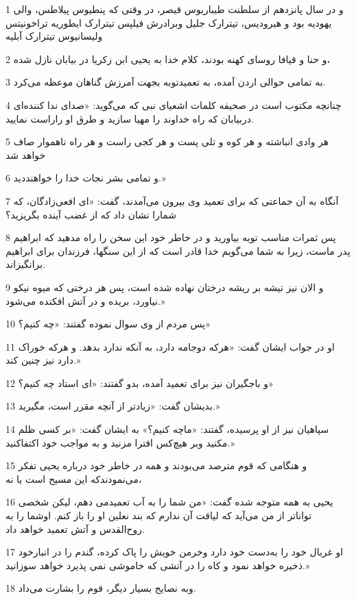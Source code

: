 \par 1 و در سال پانزدهم از سلطنت طیباریوس قیصر، در وقتی که پنطیوس پیلاطس، والی یهودیه بود و هیرودیس، تیترارک جلیل وبرادرش فیلپس تیترارک ایطوریه تراخونیتس ولیسانیوس تیترارک آبلیه
\par 2 و حنا و قیافا روسای کهنه بودند، کلام خدا به یحیی ابن زکریا در بیابان نازل شده،
\par 3 به تمامی حوالی اردن آمده، به تعمیدتوبه بجهت آمرزش گناهان موعظه می‌کرد.
\par 4 چنانچه مکتوب است در صحیفه کلمات اشعیای نبی که می‌گوید: «صدای ندا کننده‌ای دربیابان که راه خداوند را مهیا سازید و طرق او راراست نمایید.
\par 5 هر وادی انباشته و هر کوه و تلی پست و هر کجی راست و هر راه ناهموار صاف خواهد شد
\par 6 و تمامی بشر نجات خدا را خواهنددید.»
\par 7 آنگاه به آن جماعتی که برای تعمید وی بیرون می‌آمدند، گفت: «ای افعی‌زادگان، که شمارا نشان داد که از غضب آینده بگریزید؟
\par 8 پس ثمرات مناسب توبه بیاورید و در خاطر خود این سخن را راه مدهید که ابراهیم پدر ماست، زیرا به شما می‌گویم خدا قادر است که از این سنگها، فرزندان برای ابراهیم برانگیزاند.
\par 9 و الان نیز تیشه بر ریشه درختان نهاده شده است، پس هر درختی که میوه نیکو نیاورد، بریده و در آتش افکنده می‌شود.»
\par 10 پس مردم از وی سوال نموده گفتند: «چه کنیم؟»
\par 11 او در جواب ایشان گفت: «هر‌که دوجامه دارد، به آنکه ندارد بدهد. و هرکه خوراک دارد نیز چنین کند.»
\par 12 و باجگیران نیز برای تعمید آمده، بدو گفتند: «ای استاد چه کنیم؟»
\par 13 بدیشان گفت: «زیادتر از آنچه مقرر است، مگیرید.»
\par 14 سپاهیان نیز از او پرسیده، گفتند: «ماچه کنیم؟» به ایشان گفت: «بر کسی ظلم مکنید وبر هیچ‌کس افترا مزنید و به مواجب خود اکتفاکنید.»
\par 15 و هنگامی که قوم مترصد می‌بودند و همه در خاطر خود درباره یحیی تفکر می‌نمودندکه این مسیح است یا نه،
\par 16 یحیی به همه متوجه شده گفت: «من شما را به آب تعمیدمی دهم، لیکن شخصی تواناتر از من می‌آید که لیاقت آن ندارم که بند نعلین او را باز کنم. اوشما را به روح‌القدس و آتش تعمید خواهد داد.
\par 17 او غربال خود را به‌دست خود دارد وخرمن خویش را پاک کرده، گندم را در انبارخود ذخیره خواهد نمود و کاه را در آتشی که خاموشی نمی پذیرد خواهد سوزانید.»
\par 18 وبه نصایح بسیار دیگر، قوم را بشارت می‌داد.
